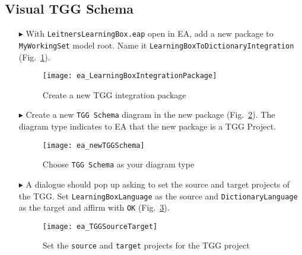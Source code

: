 \newpage
\hypertarget{schema vis}{}
\subsection{Visual TGG Schema}
\visHeader

\begin{itemize}

\item[$\blacktriangleright$] With \texttt{LeitnersLearningBox.eap} open in EA, add a new package to \texttt{MyWorkingSet} model root. Name it
\texttt{Learning\-Box\-To\-Dictionary\-Integration} (Fig.~\ref{ea:intgPackage}).

\vspace{0.5cm}

\begin{figure}[htbp]
\begin{center}
  \texttt{[image: ea\_LearningBoxIntegrationPackage]}
  \caption{Create a new TGG integration package}  
  \label{ea:intgPackage}
\end{center}
\end{figure}

\item[$\blacktriangleright$] Create a new  \texttt{TGG Schema} diagram in the new package (Fig.~\ref{ea:tgg_diagram_type}). The diagram type indicates to EA
that the new package is a TGG Project.

\vspace{0.5cm}

\begin{figure}[htbp]
\begin{center}
  \texttt{[image: ea\_newTGGSchema]}
  \caption{Choose \texttt{TGG Schema} as your diagram type}  
  \label{ea:tgg_diagram_type}
\end{center}
\end{figure}

\item[$\blacktriangleright$] A dialogue should pop up asking to set the source and target projects of the TGG. Set \texttt{Learning\-Box\-Language} as the
source and \texttt{Dictionary\-Language} as the target and affirm with \texttt{OK} (Fig.~\ref{ea:select_source_target}).

\vspace{0.5cm}

\begin{figure}[htbp]
\begin{center}
  \texttt{[image: ea\_TGGSourceTarget]}
  \caption{Set the \texttt{source} and \texttt{target} projects for the TGG project}  
  \label{ea:select_source_target}
\end{center}
\end{figure}


\end{itemize}
